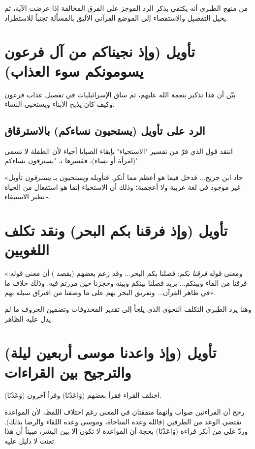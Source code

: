 \begin{fawaid}
من منهج الطبري أنه يكتفي بذكر الرد الموجز على الفرق المخالفة إذا عرضت الآية، ثم يحيل التفصيل والاستقصاء إلى الموضع القرآني الأليق بالمسألة تجنباً للاستطراد.
\end{fawaid}

\separator

\section{تأويل (وإذ نجيناكم من آل فرعون يسومونكم سوء العذاب)}
بيّن  أن هذا تذكير بنعمة الله عليهم، ثم ساق الإسرائيليات في تفصيل عذاب فرعون وكيف كان يذبح الأبناء ويستحيي النساء.

\subsection{الرد على تأويل (يستحيون نساءكم) بالاسترقاق}
انتقد  قول  الذي فرّ من تفسير "الاستحياء" بإبقاء الصبايا أحياء لأن الطفلة لا تسمى (امرأة أو نساء)، ففسرها بـ "يسترقون نساءكم".

 «حاد ابن جريج... فدخل فيما هو أعظم مما أنكر. فتأويله \textit{ويستحيون} بـ \textit{يسترقون} تأويل غير موجود في لغة عربية ولا أعجمية؛ وذلك أن الاستحياء إنما هو استفعال من الحياة نظير الاستبقاء».

\separator

\section{تأويل (وإذ فرقنا بكم البحر) ونقد تكلف اللغويين}
 «ومعنى قوله \textit{فرقنا بكم}: فصلنا بكم البحر... وقد زعم بعضهم (يقصد ) أن معنى قوله: فرقنا من الماء وبينكم... يريد فصلنا بينكم وبينه وحجزنا حين مررتم فيه. وذلك خلاف ما في ظاهر القرآن... وتفريق البحر بهم على ما وصفنا من افتراق سبله بهم».

وهنا يرد الطبري التكلف النحوي الذي يلجأ إلى تقدير المحذوفات وتضمين الحروف ما لم يدل عليه الظاهر.

\separator

\section{تأويل (وإذ واعدنا موسى أربعين ليلة) والترجيح بين القراءات}
اختلف القراء فقرأ بعضهم (وَاعَدْنَا) وقرأ آخرون (وَعَدْنَا).

\begin{fawaid}
رجح  أن القراءتين صواب وأنهما متفقتان في المعنى رغم اختلاف اللفظ، لأن المواعدة تقتضي الوعد من الطرفين (فالله وعده المناجاة، وموسى وعده اللقاء والرضا بذلك). وردّ على من أنكر قراءة (وَاعَدْنَا) بحجة أن المواعدة لا تكون إلا بين البشر، مبيناً أن هذا تعنت لا دليل عليه.
\end{fawaid}

